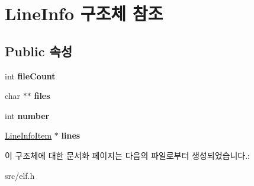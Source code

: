 \hypertarget{struct_line_info}{}\section{Line\+Info 구조체 참조}
\label{struct_line_info}
\subsection*{Public 속성}
\begin{DoxyCompactItemize}
\item 
\mbox{\label{struct_line_info_a360dc53764f78411604eb10087a4218c}} 
int {\bfseries file\+Count}
\item 
\mbox{\label{struct_line_info_ac6a6675bb12eb9ae43556403a8f98f21}} 
char $\ast$$\ast$ {\bfseries files}
\item 
\mbox{\label{struct_line_info_a5f3cdc8f3a9dceeb63412d3c1e468069}} 
int {\bfseries number}
\item 
\mbox{\label{struct_line_info_a774f0940e01fa7dd5a07dfa19acc81c6}} 
\mbox{\hyperlink{struct_line_info_item}{Line\+Info\+Item}} $\ast$ {\bfseries lines}
\end{DoxyCompactItemize}


이 구조체에 대한 문서화 페이지는 다음의 파일로부터 생성되었습니다.\+:\begin{DoxyCompactItemize}
\item 
src/elf.\+h\end{DoxyCompactItemize}

